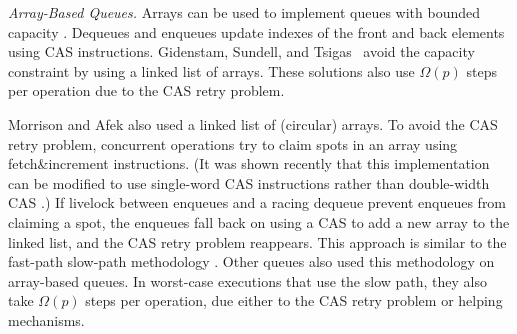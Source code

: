 \emph{Array-Based Queues.}
Arrays can be used to implement queues with bounded capacity \cite{DBLP:conf/iceccs/ColvinG05,DBLP:conf/icdcn/Shafiei09,DBLP:conf/spaa/TsigasZ01}.  
Dequeues and enqueues update
indexes of the front and back elements using CAS instructions.
Gidenstam, Sundell, and Tsigas~\cite{DBLP:conf/opodis/GidenstamST10} avoid
the capacity constraint by using a linked list of arrays.
These solutions also use $\Omega(p)$ steps per operation due to the CAS retry problem.

Morrison and Afek \cite{DBLP:conf/ppopp/MorrisonA13} also used a linked list of (circular) arrays.
To avoid the CAS retry problem, concurrent operations try to claim spots in an array using fetch\&increment instructions.
(It was shown recently that this implementation can be modified to use single-word CAS instructions rather than double-width CAS \cite{RK23}.)
If livelock between enqueues and a racing dequeue prevent enqueues from claiming a spot,
the enqueues fall back on using a CAS to add a new array to the linked list, 
and the CAS retry problem reappears.
This approach is similar to the fast-path slow-path methodology \cite{10.1145/2370036.2145835}.
Other queues \cite{Nik19,10.1145/3490148.3538572,DBLP:conf/ppopp/YangM16} also used this methodology
on array-based queues.
In worst-case executions that use the slow path,
they also take $\Omega(p)$ steps per operation, 
due either to the CAS retry problem or helping mechanisms.




